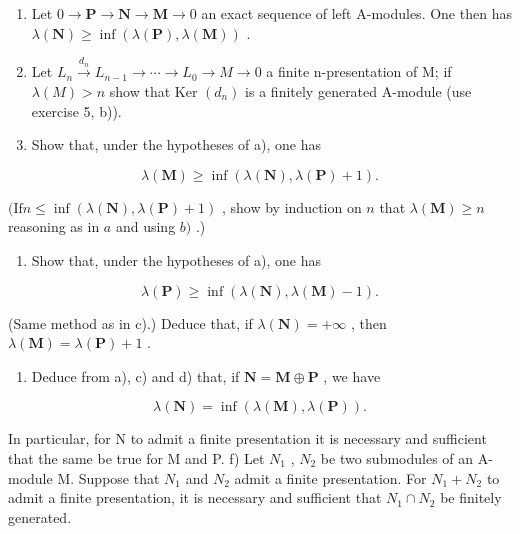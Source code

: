 \begin{enumerate}
\def\labelenumi{\alph{enumi})}
\item
  Let \(0 \to \mathbf{P} \to \mathbf{N} \to \mathbf{M} \to 0\) an exact sequence of left A-modules. One then has \(\lambda(\mathbf{N}) \geqslant \inf (\lambda(\mathbf{P}), \lambda(\mathbf{M}))\) .
\item
  Let \(L_{n} \xrightarrow{d_{n}} L_{n-1} \to \cdots \to L_{0} \to M \to 0\) a finite n-presentation of M; if \(\lambda(M) > n\) show that Ker \((d_{n})\) is a finitely generated A-module (use exercise 5, b)).
\item
  Show that, under the hypotheses of a), one has
\end{enumerate}

\[
\lambda (\mathbf {M}) \geqslant \inf \left(\lambda (\mathbf {N}), \lambda (\mathbf {P}) + 1\right).
\]

\((\mathrm{If} n \leqslant \inf (\lambda(\mathbf{N}), \lambda(\mathbf{P}) + 1)\) , show by induction on \(n\) that \(\lambda(\mathbf{M}) \geqslant n\) reasoning as in \(a\) and using \(b)\) .)

\begin{enumerate}
\def\labelenumi{\alph{enumi})}
\setcounter{enumi}{3}
\tightlist
\item
  Show that, under the hypotheses of a), one has
\end{enumerate}

\[
\lambda (\mathbf {P}) \geqslant \inf \left(\lambda (\mathbf {N}), \lambda (\mathbf {M}) - 1\right).
\]

(Same method as in c).) Deduce that, if \(\lambda(\mathbf{N}) = +\infty\) , then \(\lambda(\mathbf{M}) = \lambda(\mathbf{P}) + 1\) .

\begin{enumerate}
\def\labelenumi{\alph{enumi})}
\setcounter{enumi}{4}
\tightlist
\item
  Deduce from a), c) and d) that, if \(\mathbf{N} = \mathbf{M} \oplus \mathbf{P}\) , we have
\end{enumerate}

\[
\lambda (\mathbf {N}) = \inf \left(\lambda (\mathbf {M}), \lambda (\mathbf {P})\right).
\]

In particular, for N to admit a finite presentation it is necessary and sufficient that the same be true for M and P. f) Let \(N_{1}\) , \(N_{2}\) be two submodules of an A-module M. Suppose that \(N_{1}\) and \(N_{2}\) admit a finite presentation. For \(N_{1} + N_{2}\) to admit a finite presentation, it is necessary and sufficient that \(N_{1} \cap N_{2}\) be finitely generated.

